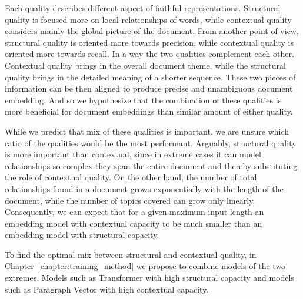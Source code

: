 

Each quality describes different aspect of faithful representations. Structural
quality is focused more on local relationships of words, while contextual
quality considers mainly the global picture of the document. From another point
of view, structural quality is oriented more towards precision, while
contextual quality is oriented more towards recall. In a way the two qualities
complement each other. Contextual quality brings in the overall document theme,
while the structural quality brings in the detailed meaning of a shorter
sequence. These two pieces of information can be then aligned to produce
precise and unambiguous document embedding. And so we hypothesize that the
combination of these qualities is more beneficial for document embeddings than
similar amount of either quality.

While we predict that mix of these qualities is important, we are unsure which
ratio of the qualities would be the most performant. Arguably, structural
quality is more important than contextual, since in extreme cases it can model
relationships so complex they span the entire document and thereby substituting
the role of contextual quality. On the other hand, the number of total
relationships found in a document grows exponentially with the length of the
document, while the number of topics covered can grow only linearly.
Consequently, we can expect that for a given maximum input length an embedding
model with contextual capacity to be much smaller than an embedding model with
structural capacity.

To find the optimal mix between structural and contextual quality, in
Chapter~\ref{chapter:training_method} we propose to combine models of the two
extremes. Models such as Transformer with high structural capacity and models
such as Paragraph Vector with high contextual capacity.

